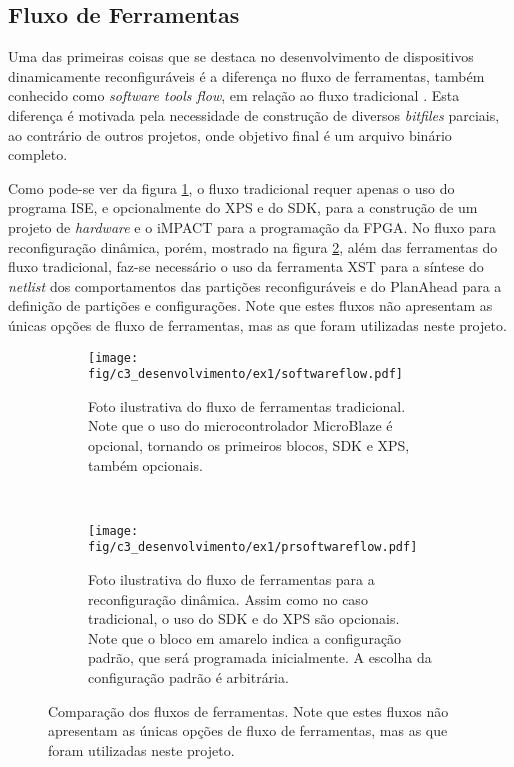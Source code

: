 \documentclass[11pt,a4paper,oneside]{book}
\begin{document}
\subsection{Fluxo de Ferramentas}
Uma das primeiras coisas que se destaca no desenvolvimento de dispositivos dinamicamente reconfiguráveis é a diferença no fluxo de ferramentas, também conhecido como \textit{software tools flow}, em relação ao fluxo tradicional \cite{ug743}.
Esta diferença é motivada pela necessidade de construção de diversos \textit{bitfiles} parciais, ao contrário de outros projetos, onde objetivo final é um arquivo binário completo.

Como pode-se ver da figura \ref{fig:ex1:softwareflow}, o fluxo tradicional requer apenas o uso do programa ISE, e opcionalmente do XPS e do SDK, para a construção de um projeto de \textit{hardware} e o iMPACT para a programação da FPGA.
No fluxo para reconfiguração dinâmica, porém, mostrado na figura \ref{fig:ex1:prsoftwareflow}, além das ferramentas do fluxo tradicional, faz-se necessário o uso da ferramenta XST para a síntese do \textit{netlist} dos comportamentos das partições reconfiguráveis e do PlanAhead para a definição de partições e configurações.
Note que estes fluxos não apresentam as únicas opções de fluxo de ferramentas, mas as que foram utilizadas neste projeto.

\begin{figure}[h]
	\centering
       	\begin{subfigure}[b]{\textwidth}
       		\centering
		\texttt{[image: fig/c3\_desenvolvimento/ex1/softwareflow.pdf]}
		\caption{Foto ilustrativa do fluxo de ferramentas tradicional. Note que o uso do microcontrolador MicroBlaze é opcional, tornando os primeiros blocos, SDK e XPS, também opcionais.}
		\label{fig:ex1:softwareflow}
	\end{subfigure}\\
	\begin{subfigure}[b]{\textwidth}
		\centering
		\texttt{[image: fig/c3\_desenvolvimento/ex1/prsoftwareflow.pdf]}
		\caption{Foto ilustrativa do fluxo de ferramentas para a reconfiguração dinâmica. Assim como no caso tradicional, o uso do SDK e do XPS são opcionais. Note que o bloco em amarelo indica a configuração padrão, que será programada inicialmente. A escolha da configuração padrão é arbitrária.}
		\label{fig:ex1:prsoftwareflow}
	\end{subfigure}
	\caption{Comparação dos fluxos de ferramentas. Note que estes fluxos não apresentam as únicas opções de fluxo de ferramentas, mas as que foram utilizadas neste projeto.}
	\label{fig:ex1:softwareflow:comparacao}
\end{figure}
\end{document}
